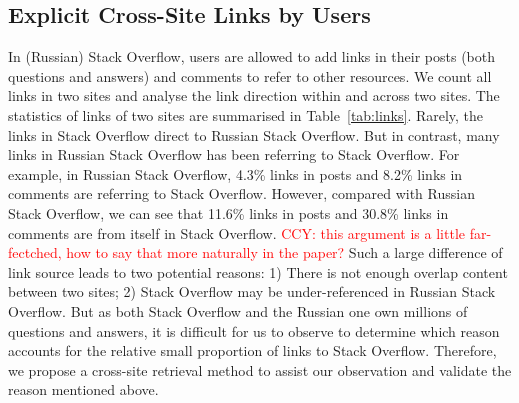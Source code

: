 \subsection{Explicit Cross-Site Links by Users}

In (Russian) Stack Overflow, users are allowed to add links in their posts (both questions and answers) and comments to refer to other resources. 
We count all links in two sites and analyse the link direction within and across two sites.
The statistics of links of two sites are summarised in Table~\ref{tab:links}.
Rarely, the links in Stack Overflow direct to Russian Stack Overflow.
But in contrast, many links in Russian Stack Overflow has been referring to Stack Overflow.
For example, in Russian Stack Overflow, 4.3\% links in posts and 8.2\% links in comments are referring to Stack Overflow.
However, compared with Russian Stack Overflow, we can see that 11.6\% links in posts and 30.8\% links in comments are from itself in Stack Overflow.
\textcolor{red}{CCY: this argument is a little far-fectched, how to say that more naturally in the paper?}
Such a large difference of link source leads to two potential reasons: 1) There is not enough overlap content between two sites; 2) Stack Overflow may be under-referenced in Russian Stack Overflow.
But as both Stack Overflow and the Russian one own millions of questions and answers, it is difficult for us to observe to determine which reason accounts for the relative small proportion of links to Stack Overflow.
Therefore, we propose a cross-site retrieval method to assist our observation and validate the reason mentioned above.
 
